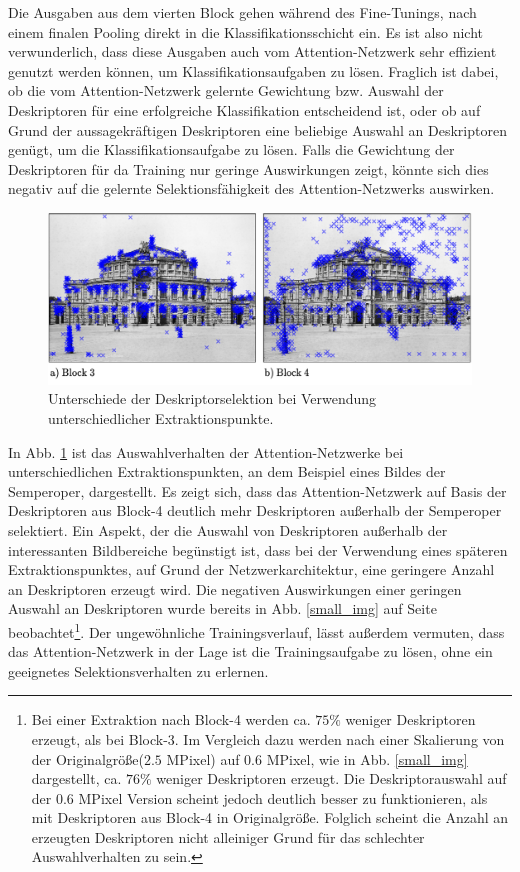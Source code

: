 Die Ausgaben aus dem vierten Block gehen während des Fine-Tunings, nach einem finalen Pooling direkt in die Klassifikationsschicht ein. Es ist also nicht verwunderlich, dass diese Ausgaben auch vom Attention-Netzwerk sehr effizient genutzt werden können, um Klassifikationsaufgaben zu lösen. Fraglich ist dabei, ob die vom Attention-Netzwerk gelernte Gewichtung bzw. Auswahl der Deskriptoren für eine erfolgreiche Klassifikation entscheidend ist, oder ob auf Grund der aussagekräftigen Deskriptoren eine beliebige Auswahl an Deskriptoren genügt, um die Klassifikationsaufgabe zu lösen. Falls die Gewichtung der Deskriptoren für da Training nur geringe Auswirkungen zeigt, könnte sich dies negativ auf die gelernte Selektionsfähigkeit des Attention-Netzwerks auswirken.
\\


\begin{figure}[h]
\centering
\includegraphics[scale=0.79]{attention_layer_diff}
\caption{Unterschiede der Deskriptorselektion bei Verwendung unterschiedlicher Extraktionspunkte.}
\label{attention_layer_diff}
\end{figure}
In Abb. \ref{attention_layer_diff} ist das Auswahlverhalten der Attention-Netzwerke bei unterschiedlichen Extraktionspunkten, an dem Beispiel eines Bildes der Semperoper, dargestellt. Es zeigt sich, dass das Attention-Netzwerk auf Basis der Deskriptoren aus Block-4 deutlich mehr Deskriptoren außerhalb der Semperoper selektiert.
Ein Aspekt, der die Auswahl von Deskriptoren außerhalb der interessanten Bildbereiche begünstigt ist, dass bei der Verwendung eines späteren Extraktionspunktes, auf Grund der Netzwerkarchitektur, eine geringere Anzahl an Deskriptoren erzeugt wird. Die negativen Auswirkungen einer geringen Auswahl an Deskriptoren wurde bereits in Abb. \ref{small_img} auf Seite \pageref{small_img} beobachtet\footnote{Bei einer Extraktion nach Block-4 werden ca. $75 \%$ weniger Deskriptoren erzeugt, als bei Block-3. Im Vergleich dazu werden nach einer Skalierung von der Originalgröße($2.5$ MPixel) auf $0.6$ MPixel, wie in Abb. \ref{small_img} dargestellt, ca. $76 \%$ weniger Deskriptoren erzeugt. Die Deskriptorauswahl auf der $0.6$ MPixel Version scheint jedoch deutlich besser zu funktionieren, als mit Deskriptoren aus Block-4 in Originalgröße. Folglich scheint die Anzahl an erzeugten Deskriptoren nicht alleiniger Grund für das schlechter Auswahlverhalten zu sein.}. Der ungewöhnliche Trainingsverlauf, lässt außerdem vermuten, dass das Attention-Netzwerk in der Lage ist die Trainingsaufgabe zu lösen, ohne ein geeignetes Selektionsverhalten zu erlernen.
